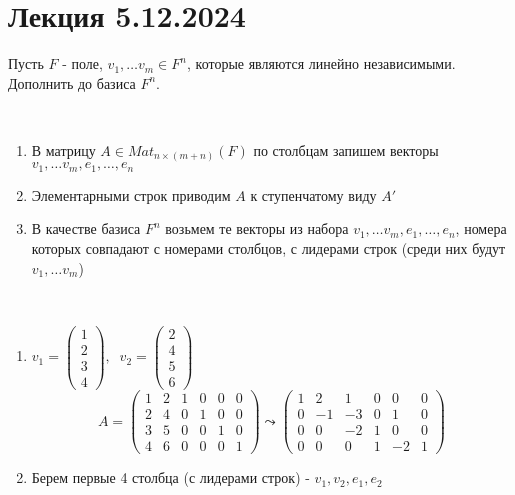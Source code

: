\section{Лекция 5.12.2024}


\begin{problem}

    Пусть $F$ - поле, $v_1, \dots v_m \in F^n$, которые являются линейно независимыми. Дополнить до базиса $F^n$.

    \begin{solution}~
        
        \begin{enumerate}
            \item В матрицу $A \in Mat_{n \times (m + n)}(F)$ по столбцам запишем векторы $v_1, \dots v_m, e_1, \dots, e_n$
            \item Элементарными строк приводим $A$ к ступенчатому виду $A'$
            \item В качестве базиса $F^n$ возьмем те векторы из набора $v_1, \dots v_m, e_1, \dots, e_n$, номера которых совпадают с номерами столбцов, с лидерами строк (среди них будут $v_1, \dots v_m$)
        \end{enumerate}

    \end{solution}

    \bigskip

    \begin{example}~
        
        \begin{enumerate}
            \item $v_1 = \begin{pmatrix}
                1 \\ 2 \\ 3 \\ 4
            \end{pmatrix}, \;\; v_2 = \begin{pmatrix}
                2 \\ 4 \\ 5 \\ 6
            \end{pmatrix}$
            $$A = \begin{pmatrix}
                1 & 2 & 1 & 0 & 0 & 0 \\
                2 & 4 & 0 & 1 & 0 & 0 \\
                3 & 5 & 0 & 0 & 1 & 0 \\
                4 & 6 & 0 & 0 & 0 & 1
            \end{pmatrix} \leadsto \begin{pmatrix}
                1 & 2 & 1 & 0 & 0 & 0 \\
                0 & -1 & -3 & 0 & 1 & 0 \\
                0 & 0 & -2 & 1 & 0 & 0 \\
                0 & 0 & 0 & 1 & -2 & 1
            \end{pmatrix}$$
            \item Берем первые 4 столбца (с лидерами строк) - $v_1, v_2, e_1, e_2$
        \end{enumerate}


\end{example}
\end{problem}
